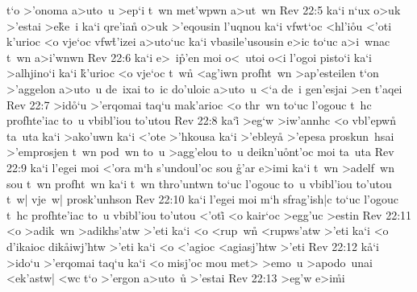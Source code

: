 t`o
>'onoma
a>uto~u
>ep`i
t~wn
met'wpwn
a>ut~wn\bibvsend
\vs Rev 22:5
ka`i
n`ux
o>uk
>'estai
>e\r{k}e~i
ka`i
qre'ian\r{}
o>uk
>'eqousin
l'uqnou
ka`i
vfwt`oc
<hl'i\r{o}u
<'oti
k'urioc
<o
vje`oc
vfw\r{t}'izei
a>uto`uc
ka`i
vbasile'usousin
e>ic
to`uc
a>i~wnac
t~wn
a>i'wnwn\bibvsend
\vs Rev 22:6
ka`i
e>~i\r{p}'en
moi
o<~utoi
o<i
l'ogoi
pisto`i
ka`i
>alhjino`i
ka`i
\r{k}'urioc
<o
vje`oc
t~wn\r{}
<ag'iwn
profht~wn
>ap'esteilen
t`on
>'aggelon
a>uto~u
de~ixai
to~ic
do'uloic
a>uto~u
<`a
de~i
gen'esjai
>en
t'aqei\bibvsend
\vs Rev 22:7
>id\r{o}`u
>'erqomai
taq`u
mak'arioc
<o
thr~wn
to`uc
l'ogouc
t~hc
profhte'iac
to~u
vbibl'iou
to'utou\bibvsend
\vs Rev 22:8
ka`i\r{}
>eg`w
>iw'annhc
<o
vbl'epwn\r{}
ta~uta
ka`i
>ako'uwn
ka`i
<'ote
>'hkousa
ka`i
>'ebleya\r{}
>'epesa
proskun~hsai
>'emprosjen
t~wn
pod~wn
to~u
>agg'elou
to~u
deikn'u\r{o}nt'oc
moi
ta~uta\bibvsend
\vs Rev 22:9
ka`i
l'egei
moi
<'ora
m`h
s'undoul'oc
sou
\r{g}'ar
e>imi
ka`i
t~wn
>adelf~wn
sou
t~wn
profht~wn
ka`i
t~wn
thro'untwn
to`uc
l'ogouc
to~u
vbibl'iou
to'utou
t~w|
vje~w|
prosk'unhson\bibvsend
\vs Rev 22:10
ka`i
l'egei
moi
m`h
sfrag'ish|c
to`uc
l'ogouc
t~hc
profhte'iac
to~u
vbibl'iou
to'utou
<'oti\r{}
<o
kair`oc
>egg'uc
>estin\bibvsend
\vs Rev 22:11
<o
>adik~wn
>adikhs'atw
>'eti
ka`i
<o
<rup~wn\r{}
<rupws'atw
>'eti
ka`i
<o
d'ikaioc
dik\r{a}iwj'htw
>'eti
ka`i
<o
<'agioc
<agiasj'htw
>'eti\bibvsend
\vs Rev 22:12
k\r{a}`i
>ido`u
>'erqomai
taq`u
ka`i
<o
misj'oc
mou
met>
>emo~u
>apodo~unai
<ek'astw|
<wc
t`o
>'ergon
a>uto~u\r{}
>'estai\bibvsend
\vs Rev 22:13
>eg'w
e>i\r{m}i
